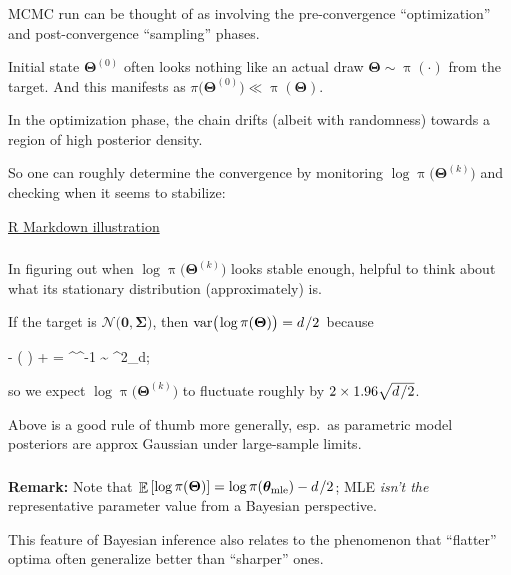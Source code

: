 \documentclass[18pt]{beamer}
\newcommand{\defineTightSpacing}{%
	\setlength{\abovedisplayskip}{.3\baselineskip}%
	\setlength{\belowdisplayskip}{.3\baselineskip}%
}
\newenvironment{tightEquation*}{%
	\defineTightSpacing%
	\begin{equation*}
}{
	\end{equation*} \ignorespacesafterend
}
\newcommand{\smallCap}[1]{{\small \MakeUppercase{#1}}}
\newcommand{\divby}{\thinnerspace /}
\newcommand{\transpose}{\text{\raisebox{.5ex}{$\intercal$}}}
\newcommand{\thinnerspace}{\mskip.5\thinmuskip}
\DeclareMathOperator{\expectation}{\mathbb{E}}
\newcommand{\normalDist}{\mathcal{N}}
\DeclareMathOperator{\density}{\pi}
\newcommand{\randVar}{\Theta}
\newcommand{\bparam}{\bm{\theta}}
\newcommand{\brandVar}{\bm{\randVar}}
\newcommand{\Mcmc}{M{\small CMC}}
\newcommand{\mcIndex}{k}
\newcommand{\nParam}{d}
\begin{document}
\begin{frame}
\frametitle{\frametitleText}
\Mcmc{} run can be thought of as involving the pre-convergence ``optimization'' and post-convergence ``sampling'' phases.

\pause
\medskip
Initial state $\brandVar^{(0)}$ often looks nothing like an actual draw $\brandVar \sim \density(\cdot)$ from the target. 
And this manifests as $\pi\bigl( \brandVar^{(0)} \bigr) \ll \density(\brandVar)$.

\pause
\medskip
In the optimization phase, the chain drifts (albeit with randomness) towards a region of high posterior density.

\pause
\medskip
So one can roughly determine the convergence by monitoring $\log \density\bigl(\brandVar^{(\mcIndex)} \bigr)$ and checking when it seems to stabilize:

{\centering
	\href{https://rpubs.com/aki-nishimura/1382691}{%
		\textcolor{linkColor}{R Markdown illustration}%
	}
	\par
}
\end{frame}


\begin{frame}
\frametitle{\frametitleText}
In figuring out when $\log \density\bigl(\brandVar^{(\mcIndex)} \bigr)$ looks stable enough, helpful to think about what its stationary distribution (approximately) is.

\pause
\medskip
If the target is $\normalDist \bigl( \bm{0}, \bm{\Sigma} \bigr)$, then $\operatorname{var}\bigl(\thinnerspace \log \density( \brandVar ) \bigr) = \nParam \divby 2 \thinnerspace$ because
\begin{tightEquation*}
- \log \density( \brandVar ) + 
	= \textstyle {} \brandVar^\transpose \bm{\Sigma}^{-1} \brandVar
	\sim {} \chi^2_{\nParam};
\end{tightEquation*}
so we expect $\log \density\bigl(\brandVar^{(\mcIndex)} \bigr)$ to fluctuate roughly by $2 \times 1.96 \sqrt{\nParam \divby 2} $.

\pause
\medskip
Above is a good rule of thumb more generally, esp.\ as parametric model posteriors are approx Gaussian under large-sample limits.
\end{frame}


\begin{frame}
\frametitle{\frametitleText}
\textbf{Remark:} 
Note that $\thinnerspace \expectation\left[ \log \density( \brandVar ) \right] =  \log \density( \bparam_\mathrm{mle} ) - \nParam \divby 2$;
\smallCap{mle} \textit{isn't the} representative parameter value from a Bayesian perspective. 

\pause
\smallskip
This feature of Bayesian inference also relates to the phenomenon that ``flatter'' optima often generalize better than ``sharper'' ones.\\
{\hfill \citep{hochreiter1997flat_minima, keskar2017large_batch_training}}
\end{frame}
\end{document}
